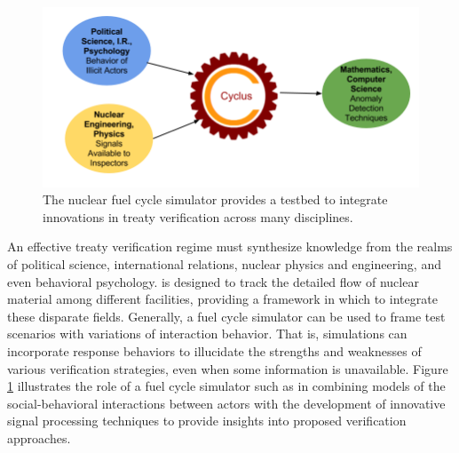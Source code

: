 \begin{figure}%
\begin{center}
\includegraphics[natwidth=162bp,natheight=227bp, scale=0.45]{./figs/cyclus_interdiscipline.png}
\end{center}
\caption{The \Cyclus nuclear fuel cycle simulator provides a testbed to integrate innovations in treaty verification across many disciplines.}
\label{fig:cyclus_diagram}
\end{figure}

An effective treaty verification regime must synthesize knowledge from the realms of political science, international relations, nuclear physics and engineering, and even behavioral psychology.  \Cyclus is designed to track the detailed flow of nuclear material among different facilities, providing a framework in which to integrate these disparate fields. Generally, a fuel cycle simulator can be used to frame test scenarios with variations of interaction behavior. That is, simulations can incorporate response behaviors to illucidate the strengths and weaknesses of various verification strategies, even when some information is unavailable. Figure \ref{fig:cyclus_diagram} illustrates  the role of a fuel cycle simulator such as \Cyclus in combining models of the social-behavioral interactions between actors with the development of innovative signal processing techniques to provide insights into proposed verification approaches. 


